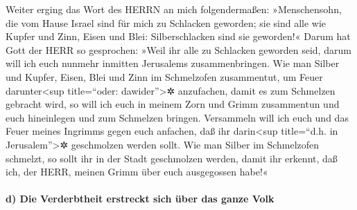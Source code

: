 Weiter erging das Wort des HERRN an mich folgendermaßen:
»Menschensohn, die vom Hause Israel sind für mich zu
Schlacken geworden; sie sind alle wie Kupfer und Zinn, Eisen und Blei:
Silberschlacken sind sie geworden!« Darum hat Gott der
HERR so gesprochen: »Weil ihr alle zu Schlacken geworden seid, darum
will ich euch nunmehr inmitten Jerusalems zusammenbringen.
Wie man Silber und Kupfer, Eisen, Blei und Zinn im
Schmelzofen zusammentut, um Feuer darunter\textless sup title=``oder:
dawider''\textgreater✲ anzufachen, damit es zum Schmelzen gebracht wird,
so will ich euch in meinem Zorn und Grimm zusammentun und euch
hineinlegen und zum Schmelzen bringen. Versammeln will
ich euch und das Feuer meines Ingrimms gegen euch anfachen, daß ihr
darin\textless sup title=``d.h. in Jerusalem''\textgreater✲ geschmolzen
werden sollt. Wie man Silber im Schmelzofen schmelzt, so
sollt ihr in der Stadt geschmolzen werden, damit ihr erkennt, daß ich,
der HERR, meinen Grimm über euch ausgegossen habe!«

\hypertarget{d-die-verderbtheit-erstreckt-sich-uxfcber-das-ganze-volk}{%
\paragraph{d) Die Verderbtheit erstreckt sich über das ganze
Volk}\label{d-die-verderbtheit-erstreckt-sich-uxfcber-das-ganze-volk}}

